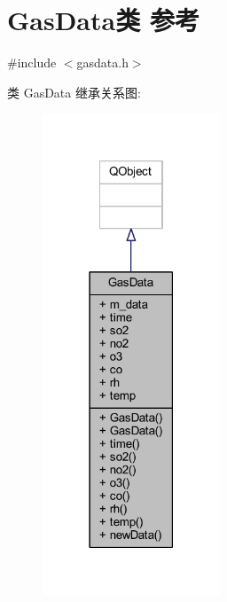 \hypertarget{class_gas_data}{}\section{Gas\+Data类 参考}
\label{class_gas_data}


{\ttfamily \#include $<$gasdata.\+h$>$}



类 Gas\+Data 继承关系图\+:
\nopagebreak
\begin{figure}[H]
\begin{center}
\leavevmode
\includegraphics[width=150pt]{class_gas_data__inherit__graph}
\end{center}
\end{figure}


